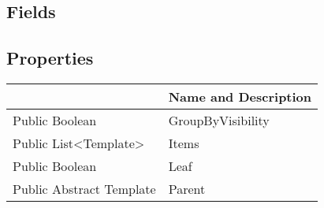 \documentclass[11pt, oneside, a4paper]{book}
\begin{document}
\subsection{Fields}

\subsection{Properties}
\begin{center}
\begin{tabular}{| p{3cm} | p{12cm} | }
\hline
\textbf{ } & \textbf{ Name and Description}\\
\hline
 Public  Boolean &  GroupByVisibility\hypertarget{SoftwareEngineeringTools.{}Documentation.{}EnumValueListTemplate.{}GroupByVisibility}{}\\
\hline
 Public  List<Template> &  Items\hypertarget{SoftwareEngineeringTools.{}Documentation.{}EnumValueListTemplate.{}Items}{}\\
\hline
 Public  Boolean &  Leaf\hypertarget{SoftwareEngineeringTools.{}Documentation.{}EnumValueListTemplate.{}Leaf}{}\\
\hline
 Public  Abstract  Template &  Parent\hypertarget{SoftwareEngineeringTools.{}Documentation.{}EnumValueListTemplate.{}Parent}{}\\
\hline
\end{tabular}
\end{center}
\end{document}
